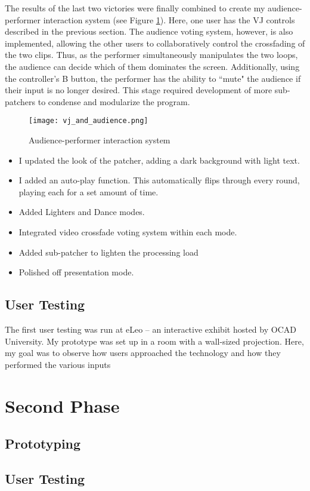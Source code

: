 The results of the last two victories were finally combined to create my audience-performer interaction system (see Figure \ref{prototyping6}). Here, one user has the VJ controls described in the previous section. The audience voting system, however, is also implemented, allowing the other users to collaboratively control the crossfading of the two clips. Thus, as the performer simultaneously manipulates the two loops, the audience can decide which of them dominates the screen. Additionally, using the controller's B button, the performer has the ability to ``mute" the audience if their input is no longer desired. This stage required development of more sub-patchers to condense and modularize the program.

\begin{figure}[t]
	\centering

	\texttt{[image: vj\_and\_audience.png]}
	\caption{Audience-performer interaction system}

	\label{prototyping6}
\end{figure}

\begin{itemize}
	\item I updated the look of the patcher, adding a dark background with light text.
	\item I added an auto-play function. This automatically flips through every round, playing each for a set amount of time.
	\item Added Lighters and Dance modes.
	\item Integrated video crossfade voting system within each mode.
	\item Added sub-patcher to lighten the processing load
	\item Polished off presentation mode.
\end{itemize}


\subsection{User Testing}

The first user testing was run at eLeo -- an interactive exhibit hosted by OCAD University. My prototype was set up in a room with a wall-sized projection. Here, my goal was to observe how users approached the technology and how they performed the various inputs


\section{Second Phase}

\subsection{Prototyping}

\subsection{User Testing}
